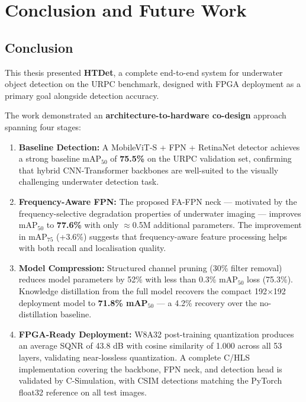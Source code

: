 \chapter{Conclusion and Future Work}

\section{Conclusion}

This thesis presented \textbf{HTDet}, a complete end-to-end system for underwater object detection on the URPC benchmark, designed with FPGA deployment as a primary goal alongside detection accuracy.

The work demonstrated an \textbf{architecture-to-hardware co-design} approach spanning four stages:

\begin{enumerate}
    \item \textbf{Baseline Detection:} A MobileViT-S + FPN + RetinaNet detector achieves a strong baseline mAP$_{50}$ of \textbf{75.5\%} on the URPC validation set, confirming that hybrid CNN-Transformer backbones are well-suited to the visually challenging underwater detection task.

    \item \textbf{Frequency-Aware FPN:} The proposed FA-FPN neck — motivated by the frequency-selective degradation properties of underwater imaging — improves mAP$_{50}$ to \textbf{77.6\%} with only $\approx$0.5M additional parameters. The improvement in mAP$_{75}$ (+3.6\%) suggests that frequency-aware feature processing helps with both recall and localisation quality.

    \item \textbf{Model Compression:} Structured channel pruning (30\% filter removal) reduces model parameters by 52\% with less than 0.3\% mAP$_{50}$ loss (75.3\%). Knowledge distillation from the full model recovers the compact 192$\times$192 deployment model to \textbf{71.8\% mAP$_{50}$} — a 4.2\% recovery over the no-distillation baseline.

    \item \textbf{FPGA-Ready Deployment:} W8A32 post-training quantization produces an average SQNR of 43.8 dB with cosine similarity of 1.000 across all 53 layers, validating near-lossless quantization. A complete C/HLS implementation covering the backbone, FPN neck, and detection head is validated by C-Simulation, with CSIM detections matching the PyTorch float32 reference on all test images.
\end{enumerate}

